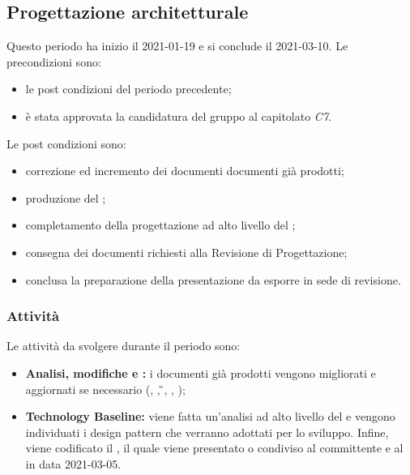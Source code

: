 \newpage
\subsection{Progettazione architetturale}
Questo periodo ha inizio il 2021-01-19 e si conclude il 2021-03-10.
Le precondizioni sono:
\begin{itemize}
	\item le post condizioni del periodo precedente;
	\item è stata approvata la candidatura del gruppo al capitolato \textit{C7}.
\end{itemize}
Le post condizioni sono:
\begin{itemize}
	\item correzione ed incremento dei documenti documenti già prodotti;
	\item produzione del \textit{};
	\item completamento della progettazione ad alto livello del ;
	\item consegna dei documenti richiesti alla Revisione di Progettazione; 	
	\item conclusa la preparazione della presentazione da esporre in sede di revisione.
\end{itemize}
\subsubsection{Attività}
Le attività da svolgere durante il periodo sono:
\begin{itemize}
	\item \textbf{Analisi, modifiche e :} i documenti già prodotti vengono migliorati e aggiornati se necessario (\NdP{}, \PdP{}, \G{}, \PdQ{}, \AdR{});
	\item \textbf{Technology Baseline:} viene fatta un'analisi ad alto livello del  e vengono individuati i design pattern che verranno adottati per lo sviluppo. Infine, viene codificato il \textit{}, il quale viene presentato o condiviso al committente e al  in data 2021-03-05.
\end{itemize}
